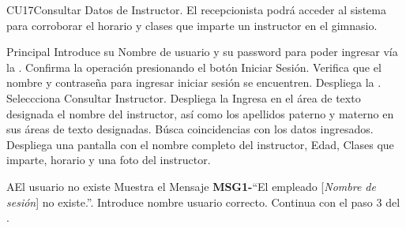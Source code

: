 	\begin{UseCase}{CU17}{Consultar Datos de Instructor.}{
			El recepcionista podrá acceder al sistema para corroborar el horario y clases que imparte 
		un instructor en el gimnasio.}
	\end{UseCase}
	\begin{UCtrayectoria}{Principal}
		\UCpaso[\UCactor] Introduce su Nombre de usuario y su password para poder ingresar vía la  \label{CU1LoginJI}.
		\UCpaso[\UCactor] Confirma la operación presionando el botón Iniciar Sesión.
		\UCpaso Verifica que el nombre y contraseña para ingresar iniciar sesión se encuentren.
		\UCpaso Despliega la .
		\UCpaso Seleccciona Consultar Instructor.
		\UCpaso Despliega la 
		\UCpaso[\UCactor]Ingresa en el área de texto designada el nombre del instructor, así como los apellidos paterno y materno
				en sus áreas de texto designadas.
		\UCpaso Búsca coincidencias con los datos ingresados.
		\UCpaso Despliega una pantalla con el nombre completo del instructor, Edad, Clases que imparte, horario y una foto del instructor.

	\end{UCtrayectoria}

		\begin{UCtrayectoriaA}{A}{El usuario no existe}
			\UCpaso[\UCactor] Muestra el Mensaje {\bf MSG1-}``El empleado [{\em Nombre de sesión}] no existe.''.
			\UCpaso[\UCactor] Introduce nombre usuario correcto.
			\UCpaso[] Continua con el paso 3 del .
		\end{UCtrayectoriaA}
		
